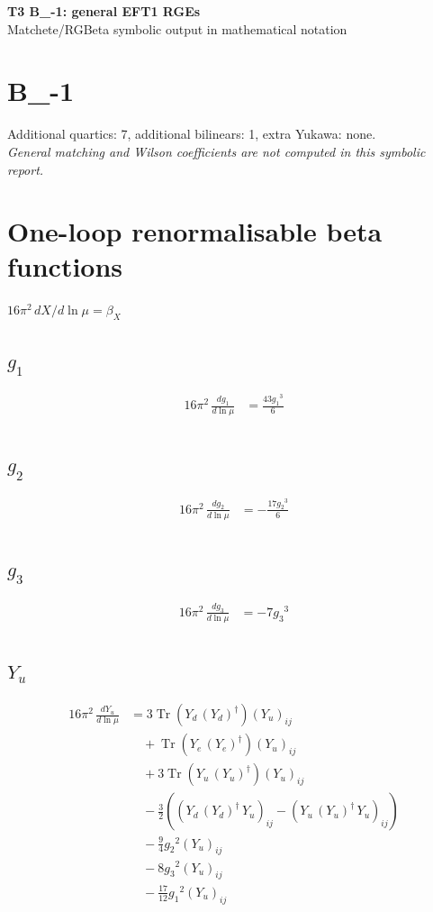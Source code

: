 \documentclass[10pt,a4paper]{article}
\begin{document}
\begin{center}
{\Large\bfseries T3 B\_-1: general EFT1 RGEs}\\[4pt]
Matchete/RGBeta symbolic output in mathematical notation
\end{center}
\bigskip
\section*{B\_-1}
Additional quartics: 7, additional bilinears: 1, extra Yukawa: none.\\
\emph{General matching and Wilson coefficients are not computed in this symbolic report.}
\clearpage
\section*{One-loop renormalisable beta functions}
$16\pi^2\,dX/d\ln\mu=\beta_X$
\subsection*{$g_1$}
\begin{align*}
16\pi^2\,\frac{d g_1}{d\ln\mu} &=\frac{43 {g_1}^3}{6} \\
\end{align*}
\subsection*{$g_2$}
\begin{align*}
16\pi^2\,\frac{d g_2}{d\ln\mu} &=-\frac{17 {g_2}^3}{6} \\
\end{align*}
\subsection*{$g_3$}
\begin{align*}
16\pi^2\,\frac{d g_3}{d\ln\mu} &=-7 {g_3}^3 \\
\end{align*}
\subsection*{$Y_u$}
\begin{align*}
16\pi^2\,\frac{d Y_u}{d\ln\mu} &=3 \operatorname{Tr}\!\left({Y_d}\,\left({Y_d}\right)^{\dagger}\right) \left({Y_u}\right)_{ij} \\
&\quad +\operatorname{Tr}\!\left({Y_e}\,\left({Y_e}\right)^{\dagger}\right) \left({Y_u}\right)_{ij} \\
&\quad +3 \operatorname{Tr}\!\left({Y_u}\,\left({Y_u}\right)^{\dagger}\right) \left({Y_u}\right)_{ij} \\
&\quad -\frac{3}{2} (\left({Y_d}\,\left({Y_d}\right)^{\dagger}\,{Y_u}\right)_{ij}-\left({Y_u}\,\left({Y_u}\right)^{\dagger}\,{Y_u}\right)_{ij}) \\
&\quad -\frac{9}{4} {g_2}^2 \left({Y_u}\right)_{ij} \\
&\quad -8 {g_3}^2 \left({Y_u}\right)_{ij} \\
&\quad -\frac{17}{12} {g_1}^2 \left({Y_u}\right)_{ij} \\
\end{align*}
\end{document}
